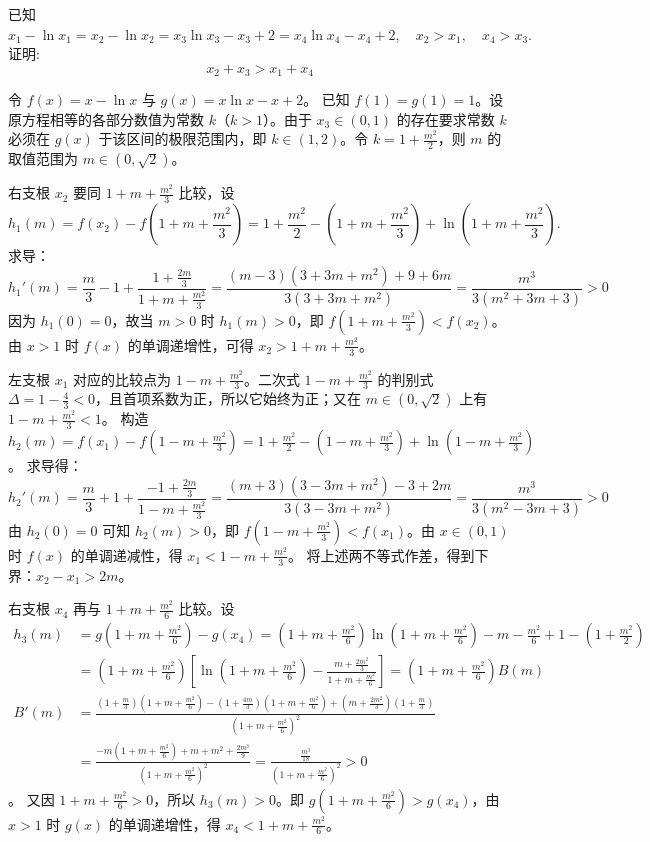 \begin{example}[交点宽度比较]
已知$x_1-\ln x_1=x_2-\ln x_2=x_3\ln x_3-x_3+2=x_4\ln x_4-x_4+2,\quad x_2>x_1,\quad x_4>x_3.$证明:\[x_2+x_3>x_1+x_4\]
\end{example}
\begin{solution}
令 $f(x) = x - \ln x$ 与 $g(x) = x\ln x - x + 2$。
已知 $f(1) = g(1) = 1$。设原方程相等的各部分数值为常数 $k$（$k > 1$）。由于 $x_3 \in (0,1)$ 的存在要求常数 $k$ 必须在 $g(x)$ 于该区间的极限范围内，即 $k \in (1,2)$。令 $k = 1 + \frac{m^2}{2}$，则 $m$ 的取值范围为 $m \in (0, \sqrt{2})$。

右支根 $x_2$ 要同 $1 + m + \frac{m^2}{3}$ 比较，设
\[
h_1(m) = f(x_2) - f\left(1 + m + \frac{m^2}{3}\right) = 1 + \frac{m^2}{2} - \left(1 + m + \frac{m^2}{3}\right) + \ln\left(1 + m + \frac{m^2}{3}\right).
\]
求导：
$$h_1'(m) = \frac{m}{3} - 1 + \frac{1 + \frac{2m}{3}}{1 + m + \frac{m^2}{3}} = \frac{(m-3)(3+3m+m^2) + 9+6m}{3(3+3m+m^2)}= \frac{m^3}{3(m^2+3m+3)} > 0$$ 
因为 $h_1(0)=0$，故当 $m > 0$ 时 $h_1(m) > 0$，即 $f(1 + m + \frac{m^2}{3}) < f(x_2)$。由 $x > 1$ 时 $f(x)$ 的单调递增性，可得 $x_2 > 1 + m + \frac{m^2}{3}$。

左支根 $x_1$ 对应的比较点为 $1 - m + \frac{m^2}{3}$。二次式 $1 - m + \frac{m^2}{3}$ 的判别式 $\Delta = 1 - \frac{4}{3} < 0$，且首项系数为正，所以它始终为正；又在 $m\in(0,\sqrt2)$ 上有 $1 - m + \frac{m^2}{3}<1$。
构造 $h_2(m) = f(x_1) - f(1 - m + \frac{m^2}{3}) = 1 + \frac{m^2}{2} - (1 - m + \frac{m^2}{3}) + \ln(1 - m + \frac{m^2}{3})$。
求导得：
$$h_2'(m) = \frac{m}{3} + 1 + \frac{-1 + \frac{2m}{3}}{1 - m + \frac{m^2}{3}} = \frac{(m+3)(3-3m+m^2) - 3+2m}{3(3-3m+m^2)}= \frac{m^3}{3(m^2-3m+3)} > 0$$
由 $h_2(0)=0$ 可知 $h_2(m) > 0$，即 $f(1 - m + \frac{m^2}{3}) < f(x_1)$。由 $x \in (0,1)$ 时 $f(x)$ 的单调递减性，得 $x_1 < 1 - m + \frac{m^2}{3}$。
将上述两不等式作差，得到下界：$x_2 - x_1 > 2m$。

右支根 $x_4$ 再与 $1 + m + \frac{m^2}{6}$ 比较。设
\begin{align*}
h_3(m) &= g(1 + m + \frac{m^2}{6}) - g(x_4) = (1 + m + \frac{m^2}{6})\ln(1 + m + \frac{m^2}{6}) - m - \frac{m^2}{6} + 1 - (1 + \frac{m^2}{2})\\
&= (1 + m + \frac{m^2}{6})\left[ \ln(1 + m + \frac{m^2}{6}) - \frac{m + \frac{2m^2}{3}}{1 + m + \frac{m^2}{6}} \right]=(1 + m + \frac{m^2}{6})B(m)\\
B'(m) &= \frac{(1+\frac{m}{3})(1+m+\frac{m^2}{6}) - (1+\frac{4m}{3})(1+m+\frac{m^2}{6}) + (m+\frac{2m^2}{3})(1+\frac{m}{3})}{(1+m+\frac{m^2}{6})^2}\\
&=\frac{-m(1+m+\frac{m^2}{6}) + m + m^2 + \frac{2m^3}{9}}{(1+m+\frac{m^2}{6})^2} = \frac{\frac{m^3}{18}}{(1+m+\frac{m^2}{6})^2} > 0
\end{align*}。
又因 $1 + m + \frac{m^2}{6} > 0$，所以 $h_3(m) > 0$。即 $g(1 + m + \frac{m^2}{6}) > g(x_4)$，由 $x > 1$ 时 $g(x)$ 的单调递增性，得 $x_4 < 1 + m + \frac{m^2}{6}$。


\end{solution}
